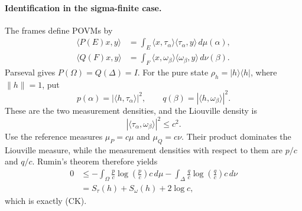 \documentclass[11pt]{article}
\begin{document}
\paragraph{Identification in the sigma-finite case.}
The frames define POVMs by
\begin{align*}
 \langle P(E)x,y\rangle
   &=\int_E\langle x,\tau_\alpha\rangle
        \langle\tau_\alpha,y\rangle\,d\mu(\alpha),\\
 \langle Q(F)x,y\rangle
   &=\int_F\langle x,\omega_\beta\rangle
        \langle\omega_\beta,y\rangle\,d\nu(\beta).
\end{align*}
Parseval gives $P(\Omega)=Q(\Delta)=I$.  For the pure state
$\rho_h=|h\rangle\langle h|$, where $\|h\|=1$, put
\[
 p(\alpha)=|\langle h,\tau_\alpha\rangle|^2,
 \qquad q(\beta)=|\langle h,\omega_\beta\rangle|^2.
\]
These are the two measurement densities, and the Liouville density is
\[
 |\langle\tau_\alpha,\omega_\beta\rangle|^2\le c^2.
\]
Use the reference measures $\mu_P=c\mu$ and $\mu_Q=c\nu$.  Their product
dominates the Liouville measure, while the measurement densities with respect
to them are $p/c$ and $q/c$.  Rumin's theorem therefore yields
\begin{align*}
0
&\le -\int_\Omega \frac{p}{c}\log\!\left(\frac{p}{c}\right)c\,d\mu
     -\int_\Delta \frac{q}{c}\log\!\left(\frac{q}{c}\right)c\,d\nu\\
&=S_\tau(h)+S_\omega(h)+2\log c,
\end{align*}
which is exactly \textup{(CK)}.
\end{document}
